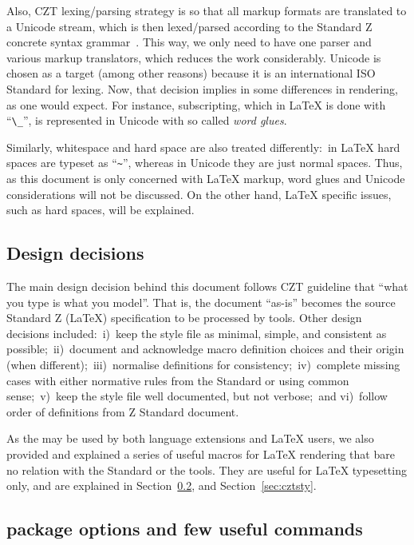 \documentclass{article}
\begin{document}
Also, CZT lexing/parsing strategy is so that all markup formats are translated
to a Unicode stream, which is then lexed/parsed according to the Standard Z
concrete syntax grammar~\cite[Ch.~8]{isoz}. This way, we only need to have one parser and various
markup translators, which reduces the work considerably. Unicode is chosen as
a target (among other reasons) because it is an international ISO Standard for lexing. Now, that
decision implies in some differences in rendering, as one would expect. For
instance, subscripting, which in \LaTeX{} is done with ``\verb|\_|'', is represented
in Unicode with so called \textit{word glues}.

Similarly, whitespace and hard space are also treated differently:~in \LaTeX{}
hard spaces are typeset as ``\verb|~|'', whereas in Unicode they are just normal spaces. Thus,
as this document is only concerned with \LaTeX{} markup, word glues and Unicode
considerations will not be discussed. On the other hand, \LaTeX{} specific issues,
such as hard spaces, will be explained.

\subsection{Design decisions}\label{sec:intro-design}

The main design decision behind this document follows CZT guideline that
``what you type is what you model''. That is, the document ``as-is'' becomes
the source Standard Z (\LaTeX) specification to be processed by tools. Other
design decisions included:~i)~keep the style file as minimal, simple, and
consistent as possible;~ii)~document and acknowledge macro definition choices
and their origin (when different);~iii)~normalise definitions for
consistency;~iv)~complete missing cases with either normative rules from
the Standard or using common sense;~v)~keep the style file well documented,
but not verbose;~and vi)~follow order of definitions from Z Standard document.

As the \cztstylefile may be used by both language extensions and \LaTeX{} users,
we also provided and explained a series of useful macros for \LaTeX{} rendering
that bare no relation with the Standard or the tools. They are useful for \LaTeX{}
typesetting only, and are explained in Section~\ref{sec:intro-cztopt}, and
Section~\ref{sec:cztsty}.

\subsection{\cztstylefile{} package options and few useful commands}\label{sec:intro-cztopt}
\end{document}
